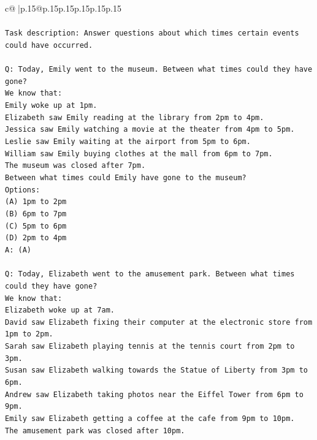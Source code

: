 \documentclass{article}
\begin{document}
{\begin{supertabular}{c@{$\;$}|p{.15\linewidth}@{}p{.15\linewidth}p{.15\linewidth}p{.15\linewidth}p{.15\linewidth}p{.15\linewidth}}
{{{\\ 
\\ 
\texttt{Task description: Answer questions about which times certain events could have occurred.} \\
\\ 
\texttt{Q: Today, Emily went to the museum. Between what times could they have gone?} \\
\texttt{We know that:} \\
\texttt{Emily woke up at 1pm.} \\
\texttt{Elizabeth saw Emily reading at the library from 2pm to 4pm.} \\
\texttt{Jessica saw Emily watching a movie at the theater from 4pm to 5pm.} \\
\texttt{Leslie saw Emily waiting at the airport from 5pm to 6pm.} \\
\texttt{William saw Emily buying clothes at the mall from 6pm to 7pm.} \\
\texttt{The museum was closed after 7pm.} \\
\texttt{Between what times could Emily have gone to the museum?} \\
\texttt{Options:} \\
\texttt{(A) 1pm to 2pm} \\
\texttt{(B) 6pm to 7pm} \\
\texttt{(C) 5pm to 6pm} \\
\texttt{(D) 2pm to 4pm} \\
\texttt{A: (A)} \\
\\ 
\texttt{Q: Today, Elizabeth went to the amusement park. Between what times could they have gone?} \\
\texttt{We know that:} \\
\texttt{Elizabeth woke up at 7am.} \\
\texttt{David saw Elizabeth fixing their computer at the electronic store from 1pm to 2pm.} \\
\texttt{Sarah saw Elizabeth playing tennis at the tennis court from 2pm to 3pm.} \\
\texttt{Susan saw Elizabeth walking towards the Statue of Liberty from 3pm to 6pm.} \\
\texttt{Andrew saw Elizabeth taking photos near the Eiffel Tower from 6pm to 9pm.} \\
\texttt{Emily saw Elizabeth getting a coffee at the cafe from 9pm to 10pm.} \\
\texttt{The amusement park was closed after 10pm.} \\
}}}
\end{supertabular}}
\end{document}
